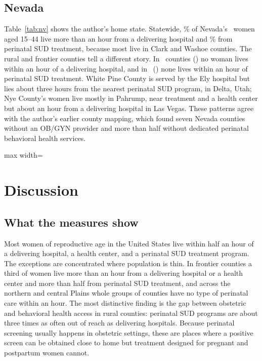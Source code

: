\documentclass[10pt,twocolumn,letterpaper]{article}
\begin{document}
\subsection{Nevada}
Table~\ref{tab:nv} shows the author's home state. Statewide, \NVOBSixty\% of Nevada's \NVWomen\ women aged 15--44 live more than an hour from a delivering hospital and \NVPPWSixty\% from perinatal SUD treatment, because most live in Clark and Washoe counties. The rural and frontier counties tell a different story. In \NVN\ counties (\NVList) no woman lives within an hour of a delivering hospital, and in \NVNPPW\ (\NVListPPW) none lives within an hour of perinatal SUD treatment. White Pine County is served by the Ely hospital but lies about three hours from the nearest perinatal SUD program, in Delta, Utah; Nye County's women live mostly in Pahrump, near treatment and a health center but about an hour from a delivering hospital in Las Vegas. These patterns agree with the author's earlier county mapping, which found seven Nevada counties without an OB/GYN provider and more than half without dedicated perinatal behavioral health services.

\begin{table}[tbp]
\centering\footnotesize
\caption{Nevada counties: women-weighted median drive (minutes) and share of women beyond 60 minutes for the headline care types. Hosp.: delivering hospital; PPW: perinatal SUD treatment; HC: health center.}\label{tab:nv}
\begin{adjustbox}{max width=\columnwidth}\end{adjustbox}
\end{table}

\FloatBarrier
\section{Discussion}\label{sec:disc}

\subsection{What the measures show}
Most women of reproductive age in the United States live within half an hour of a delivering hospital, a health center, and a perinatal SUD treatment program. The exceptions are concentrated where population is thin. In frontier counties a third of women live more than an hour from a delivering hospital or a health center and more than half from perinatal SUD treatment, and across the northern and central Plains whole groups of counties have no type of perinatal care within an hour. The most distinctive finding is the gap between obstetric and behavioral health access in rural counties: perinatal SUD programs are about three times as often out of reach as delivering hospitals. Because perinatal screening usually happens in obstetric settings, these are places where a positive screen can be obtained close to home but treatment designed for pregnant and postpartum women cannot.
\end{document}
